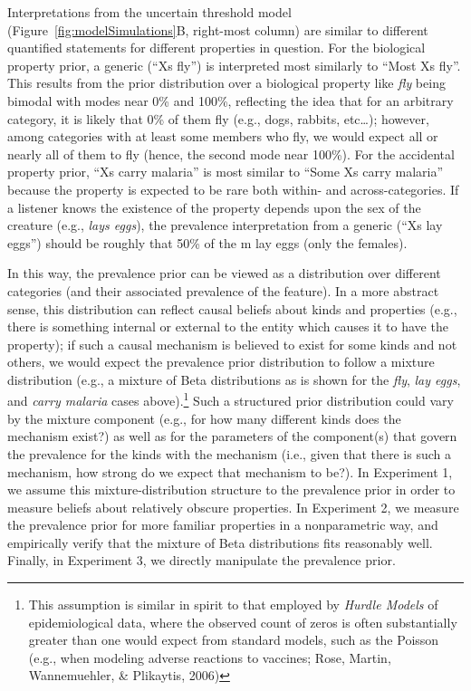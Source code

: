 \documentclass[,man,floatsintext]{apa6}
\let\rmarkdownfootnote\footnote%
\def\footnote{\protect\rmarkdownfootnote}
\theoremstyle{definition}
\theoremstyle{definition}
\theoremstyle{definition}
\theoremstyle{remark}
\begin{document}
Interpretations from the uncertain threshold model
(Figure~\ref{fig:modelSimulations}B, right-most column) are similar to
different quantified statements for different properties in question.
For the biological property prior, a generic (\enquote{Xs fly}) is
interpreted most similarly to \enquote{Most Xs fly}. This results from
the prior distribution over a biological property like \emph{fly} being
bimodal with modes near 0\% and 100\%, reflecting the idea that for an
arbitrary category, it is likely that 0\% of them fly (e.g., dogs,
rabbits, etc\ldots{}); however, among categories with at least some
members who fly, we would expect all or nearly all of them to fly
(hence, the second mode near 100\%). For the accidental property prior,
\enquote{Xs carry malaria} is most similar to \enquote{Some Xs carry
malaria} because the property is expected to be rare both within- and
across-categories. If a listener knows the existence of the property
depends upon the sex of the creature (e.g., \emph{lays eggs}), the
prevalence interpretation from a generic (\enquote{Xs lay eggs}) should
be roughly that 50\% of the m lay eggs (only the females).

In this way, the prevalence prior can be viewed as a distribution over
different categories (and their associated prevalence of the feature).
In a more abstract sense, this distribution can reflect causal beliefs
about kinds and properties (e.g., there is something internal or
external to the entity which causes it to have the property); if such a
causal mechanism is believed to exist for some kinds and not others, we
would expect the prevalence prior distribution to follow a mixture
distribution (e.g., a mixture of Beta distributions as is shown for the
\emph{fly}, \emph{lay eggs}, and \emph{carry malaria} cases
above).\footnote{This assumption is similar in spirit to that employed
  by \emph{Hurdle Models} of epidemiological data, where the observed
  count of zeros is often substantially greater than one would expect
  from standard models, such as the Poisson (e.g., when modeling adverse
  reactions to vaccines; Rose, Martin, Wannemuehler, \& Plikaytis, 2006)}
Such a structured prior distribution could vary by the mixture component
(e.g., for how many different kinds does the mechanism exist?) as well
as for the parameters of the component(s) that govern the prevalence for
the kinds with the mechanism (i.e., given that there is such a
mechanism, how strong do we expect that mechanism to be?). In Experiment
1, we assume this mixture-distribution structure to the prevalence prior
in order to measure beliefs about relatively obscure properties. In
Experiment 2, we measure the prevalence prior for more familiar
properties in a nonparametric way, and empirically verify that the
mixture of Beta distributions fits reasonably well. Finally, in
Experiment 3, we directly manipulate the prevalence prior.
\end{document}
